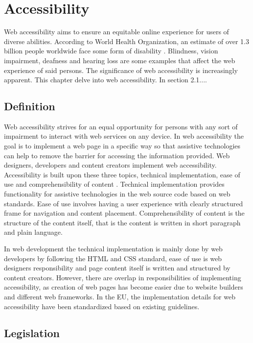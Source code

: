 \chapter{Accessibility\label{accessibility}}

Web accessibility aims to ensure an equitable online experience for users of diverse abilities. According to World Health Organization, an estimate of over 1.3 billion people worldwide face some form of disability \citep{whodisability}. Blindness, vision impairment, deafness and hearing loss are some examples that affect the web experience of said persons. The significance of web accessibility is increasingly apparent. This chapter delve into web accessibility. In section 2.1....

\section{Definition}

Web accessibility strives for an equal opportunity for persons with any sort of impairment to interact with web services on any device. In web accessibility the goal is to implement a web page in a specific way so that assistive technologies can help to remove the barrier for accessing the information provided. Web designers, developers and content creators implement web accessibility. Accessibility is built upon these three topics, technical implementation, ease of use and comprehensibility of content \citep{webaccessibilitydefinition}. Technical implementation provides functionality for assistive technologies in the web source code based on web standards. Ease of use involves having a user experience with clearly structured frame for navigation and content placement. Comprehensibility of content is the structure of the content itself, that is the content is written in short paragraph and plain language. 

In web development the technical implementation is mainly done by web developers by following the HTML and CSS standard, ease of use is web designers responsibility and page content itself is written and structured by content creators. However, there are overlap in responsibilities of implementing accessibility, as creation of web pages has become easier due to website builders and different web frameworks. In the EU, the implementation details for web accessibility have been standardized based on existing guidelines.

\section{Legislation}

